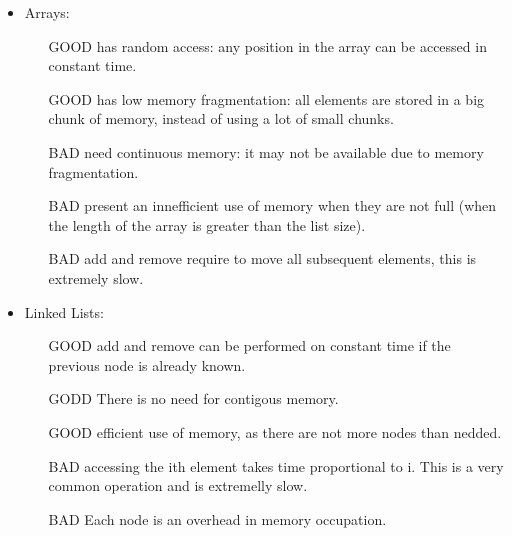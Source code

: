 \documentclass[a4paper, 9pt]{extarticle}
\begin{document}
\begin{itemize}

  \item Arrays:

    \begin{itemize}

      \item[GOOD] has random access: any position in the array can be accessed in constant time.

      \item[GOOD] has low memory fragmentation: all elements are stored in a big chunk of memory, instead of using a lot of small chunks.

      \item[BAD] need continuous memory: it may not be available due to memory fragmentation.

      \item[BAD] present an innefficient use of memory when they are not full (when the length of the array is greater than the list size).

      \item[BAD]  add and remove require to move all subsequent elements, this is extremely slow.

    \end{itemize}

  \item Linked Lists:

    \begin{itemize}

      \item[GOOD] add and remove can be performed on constant time if the previous node is already known.

      \item[GODD] There is no need for contigous memory.

      \item[GOOD] efficient use of memory, as there are not more nodes than nedded.

      \item[BAD] accessing the ith element takes time proportional to i. This is a very common operation and is extremelly slow.

      \item[BAD] Each node is an overhead in memory occupation.

    \end{itemize}

\end{itemize}
\end{document}

